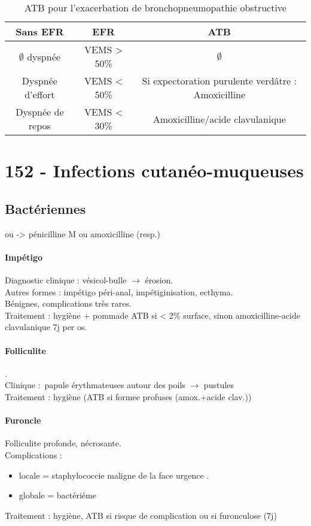 \begin{table}[htpb]
  \centering
  \caption{ATB pour l'exacerbation de bronchopneumopathie obstructive}
  \begin{tabular}{ccc}
    \toprule
    Sans EFR& EFR& ATB\\
    \midrule
    \(\emptyset\) dyspnée& VEMS \textgreater{} 50\%& \(\emptyset\)\\
    Dyspnée d'effort& VEMS \textless{} 50\%& Si expectoration purulente verdâtre :
    Amoxicilline\\
    Dyspnée de repos& VEMS \textless{} 30\%& Amoxicilline/acide clavulanique\\
    \bottomrule
  \end{tabular}
\end{table}
\section{152 - Infections cutanéo-muqueuses}%
\label{sec:ue_6_152_infections_cutaneo_muqueuses}

\subsection{Bactériennes}%
\label{sub:bacteriennes}

 ou  -> pénicilline M ou amoxicilline (resp.)

\paragraph{Impétigo} Diagnostic clinique : vésicol-bulle $\rightarrow$ érosion.\\
Autres formes : impétigo péri-anal, impétiginisation, ecthyma. \\
Bénignes, complications très rares.\\
Traitement : hygiène + pommade ATB si < 2\% surface, sinon amoxicilline-acide clavulanique
7j per os.

\paragraph{Folliculite} . \\
Clinique : papule érythmateuses autour des poils $\rightarrow$ pustules\\
Traitement : hygiène (ATB si formee profuses (amox.+acide clav.))

\paragraph{Furoncle} Folliculite profonde, nécrosante. \\
Complications : 
\begin{itemize}
  \item locale = staphylococcie maligne de la face \danger urgence \faHospital{}.
  \item globale = bactériéme 
\end{itemize}
Traitement : hygiène, ATB si risque de complication ou si furonculose (7j)

